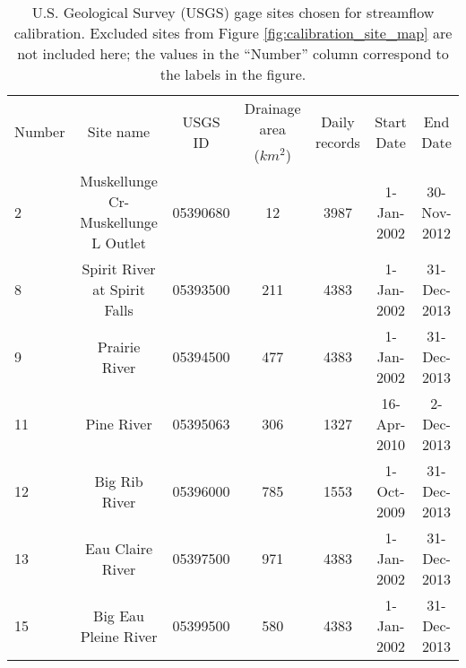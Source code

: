 \begin{table}[h]
	\caption[Gage sites chosen for streamflow calibration]{U.S. Geological Survey (USGS) gage sites chosen for streamflow calibration. Excluded sites from Figure \ref{fig:calibration_site_map} are not included here; the values in the ``Number'' column correspond to the labels in the figure.}
	\centering
\begin{tabular}{l c ccccc}
\hline
\multirow{2}{*}{Number}	&\multirow{2}{*}{Site name}          & \multirow{2}{*}{USGS ID} & 			Drainage area  			& \multirow{2}{*}{Daily records} & \multirow{2}{*}{Start Date} & \multirow{2}{*}{End Date} \\
						& 							 		& 					  		& 	($km^2$)  						 & 								  	&  								& \\
\hline \hline
2	&	Muskellunge Cr-Muskellunge L Outlet    & 05390680                    & 12                                      & 3987                              & 1-Jan-2002                     & 30-Nov-2012 \\
8	&	Spirit River at Spirit Falls           & 05393500                    & 211                                     & 4383                              & 1-Jan-2002                     & 31-Dec-2013                  \\
9	&	Prairie River                          & 05394500                    & 477                                     & 4383                              & 1-Jan-2002                     & 31-Dec-2013                  \\
11	&	Pine River                             & 05395063                    & 306                                     & 1327                              & 16-Apr-2010                    & 2-Dec-2013                   \\
12	&	Big Rib River                          & 05396000                    & 785                                     & 1553                              & 1-Oct-2009                     & 31-Dec-2013                  \\
13	&	Eau Claire River                       & 05397500                    & 971                                     & 4383                              & 1-Jan-2002                     & 31-Dec-2013                  \\
15	&	Big Eau Pleine River                   & 05399500                    & 580                                     & 4383                              & 1-Jan-2002                     & 31-Dec-2013                  \\

\end{tabular}
\end{table}
